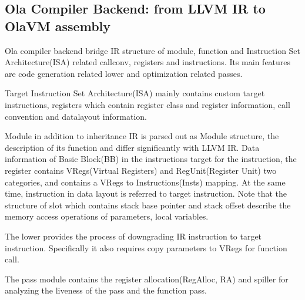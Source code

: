 \subsection{Ola Compiler Backend: from LLVM IR to OlaVM assembly}

Ola compiler backend bridge IR structure of module, function and Instruction Set Architecture(ISA) related callconv, registers and instructions.
Its main features are code generation related lower and optimization related passes.

Target Instruction Set Architecture(ISA) mainly contains custom target instructions, registers which contain register class and register information, call convention and datalayout information.

Module in addition to inheritance IR is parsed out as Module structure, the description of its function and differ significantly with LLVM IR.
Data information of Basic Block(BB) in the instructions target for the instruction, the register contains VRegs(Virtual Registers) and RegUnit(Register Unit) two categories, and contains a VRegs to Instructions(Insts) mapping.
At the same time, instruction in data layout is referred to target instruction. Note that the structure of slot which contains stack base pointer and stack offset describe the memory access operations of parameters, local variables.

The lower provides the process of downgrading IR instruction to target instruction. Specifically it also requires copy parameters to VRegs for function call.

The pass module contains the register allocation(RegAlloc, RA) and spiller for analyzing the liveness of the pass and the function pass.










